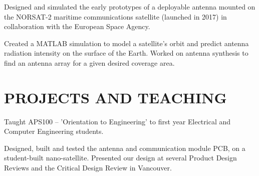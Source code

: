 \documentclass{ResumeTemplate}
\begin{document}
	\workitemsone
	{Designed and simulated the early prototypes of a deployable antenna mounted on the NORSAT-2 maritime communications satellite (launched in 2017) in collaboration with the European Space Agency.}
	
	
	\workitemsone
	{Created a MATLAB simulation to model a satellite's orbit and predict antenna radiation intensity on the surface of the Earth. Worked on antenna synthesis to find an antenna array for a given desired coverage area.}
	
	\section{PROJECTS AND TEACHING}
	

	\workitemsone
	{Taught APS100 -- 'Orientation to Engineering' to first year Electrical and Computer Engineering students.}
	

	\workitemstwo
	{Designed, built and tested the antenna and communication module PCB, on a student-built nano-satellite.}
	{Presented our design at several Product Design Reviews and the Critical Design Review in Vancouver.}

	
\end{document}
